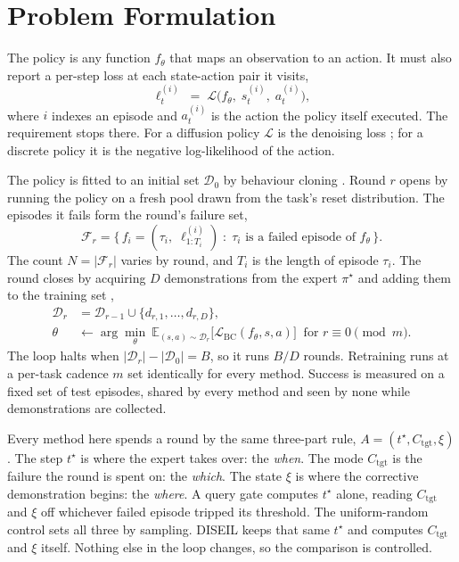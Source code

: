\section{Problem Formulation}

The policy is any function $f_\theta$ that maps an observation to an action. It
must also report a per-step loss at each state-action pair it visits,
%
\begin{equation}
\label{eq:signal}
\ell^{(i)}_t \;=\; \mathcal{L}\big(f_\theta,\; s^{(i)}_t,\; a^{(i)}_t\big),
\end{equation}
%
where $i$ indexes an episode and $a^{(i)}_t$ is the action the policy itself
executed. The requirement stops there. For a diffusion policy $\mathcal{L}$ is the
denoising loss \cite{chi2023diffusionpolicy}; for a discrete policy it is the
negative log-likelihood of the action.

The policy is fitted to an initial set $\mathcal{D}_0$ by behaviour cloning
\cite{pomerleau1988alvinn,bain1995cloning}. Round $r$ opens by running the policy
on a fresh pool drawn from the task's reset distribution. The episodes it fails
form the round's failure set,
%
\begin{equation}
\label{eq:failures}
\mathcal{F}_r = \big\{\, f_i = (\tau_i,\; \ell^{(i)}_{1:T_i}) \;:\; \tau_i
\text{ is a failed episode of } f_\theta \,\big\}.
\end{equation}
%
The count $N = |\mathcal{F}_r|$ varies by round, and $T_i$ is the length of
episode $\tau_i$. The round closes by acquiring $D$ demonstrations from the expert
$\pi^\star$ and adding them to the training set \cite{ross2011dagger},
%
\begin{equation}
\label{eq:loop}
\begin{aligned}
\mathcal{D}_r &= \mathcal{D}_{r-1} \cup \{d_{r,1},\dots,d_{r,D}\},\\
\theta &\leftarrow \arg\min_\theta\ \mathbb{E}_{(s,a)\sim\mathcal{D}_r}
\big[\mathcal{L}_{\mathrm{BC}}(f_\theta, s, a)\big] \ \text{ for } r \equiv 0
\!\!\pmod m.
\end{aligned}
\end{equation}
%
The loop halts when $|\mathcal{D}_r| - |\mathcal{D}_0| = B$, so it runs $B/D$
rounds. Retraining runs at a per-task cadence $m$ set identically for every
method. Success is measured on a fixed set of test episodes, shared by every method and
seen by none while demonstrations are collected.

Every method here spends a round by the same three-part rule,
$A = (t^\star, C_{\mathrm{tgt}}, \xi)$. The step $t^\star$ is where the expert
takes over: the \emph{when}. The mode $C_{\mathrm{tgt}}$ is the failure the round
is spent on: the \emph{which}. The state $\xi$ is where the corrective
demonstration begins: the \emph{where}. A query gate computes $t^\star$ alone,
reading $C_{\mathrm{tgt}}$ and $\xi$ off whichever failed episode tripped its
threshold. The uniform-random control sets all three by sampling. DISEIL keeps
that same $t^\star$ and computes $C_{\mathrm{tgt}}$ and $\xi$ itself. Nothing else
in the loop changes, so the comparison is controlled.

